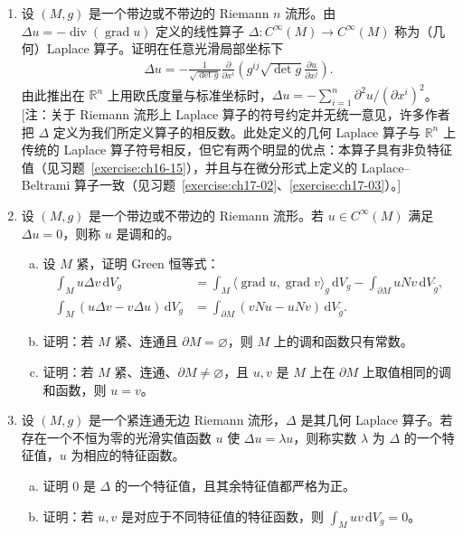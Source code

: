 \documentclass[../../main.tex]{subfiles}
\begin{document}
\begin{enumerate}
\item\label{exercise:ch16-13} 设 $(M,g)$ 是一个带边或不带边的 Riemann $n$ 流形。由 $\Delta u=-\operatorname{div}(\operatorname{grad}u)$ 定义的线性算子 $\Delta:C^\infty(M)\to C^\infty(M)$ 称为（几何）Laplace 算子。证明在任意光滑局部坐标下
\begin{align*}
\Delta u=-\frac{1}{\sqrt{\det g}}\frac{\partial}{\partial x^i}\left(g^{ij}\sqrt{\det g}\frac{\partial u}{\partial x^j}\right).
\end{align*}
由此推出在 $\mathbb{R}^n$ 上用欧氏度量与标准坐标时，$\Delta u=-\sum_{i=1}^n\partial^2u/(\partial x^i)^2$。[注：关于 Riemann 流形上 Laplace 算子的符号约定并无统一意见，许多作者把 $\Delta$ 定义为我们所定义算子的相反数。此处定义的几何 Laplace 算子与 $\mathbb{R}^n$ 上传统的 Laplace 算子符号相反，但它有两个明显的优点：本算子具有非负特征值（见习题~\cref{exercise:ch16-15}），并且与在微分形式上定义的 Laplace--Beltrami 算子一致（见习题~\cref{exercise:ch17-02}、\cref{exercise:ch17-03}）。]

\item\label{exercise:ch16-14} 设 $(M,g)$ 是一个带边或不带边的 Riemann 流形。若 $u\in C^\infty(M)$ 满足 $\Delta u=0$，则称 $u$ 是调和的。
\begin{enumerate}[(a)]
\item 设 $M$ 紧，证明 Green 恒等式：
\begin{align*}
\int_M u\Delta v\,\mathrm{d}V_g&=\int_M\langle\operatorname{grad}u,\operatorname{grad}v\rangle_g\,\mathrm{d}V_g-\int_{\partial M}uNv\,\mathrm{d}V_{\widetilde g},\\
\int_M(u\Delta v-v\Delta u)\,\mathrm{d}V_g&=\int_{\partial M}(vNu-uNv)\,\mathrm{d}V_{\widetilde g}.
\end{align*}
\item 证明：若 $M$ 紧、连通且 $\partial M=\varnothing$，则 $M$ 上的调和函数只有常数。
\item 证明：若 $M$ 紧、连通、$\partial M\neq\varnothing$，且 $u,v$ 是 $M$ 上在 $\partial M$ 上取值相同的调和函数，则 $u=v$。
\end{enumerate}

\item\label{exercise:ch16-15} 设 $(M,g)$ 是一个紧连通无边 Riemann 流形，$\Delta$ 是其几何 Laplace 算子。若存在一个不恒为零的光滑实值函数 $u$ 使 $\Delta u=\lambda u$，则称实数 $\lambda$ 为 $\Delta$ 的一个特征值，$u$ 为相应的特征函数。
\begin{enumerate}[(a)]
\item 证明 $0$ 是 $\Delta$ 的一个特征值，且其余特征值都严格为正。
\item 证明：若 $u,v$ 是对应于不同特征值的特征函数，则 $\int_M uv\,\mathrm{d}V_g=0$。
\end{enumerate}


\end{enumerate}
\end{document}
